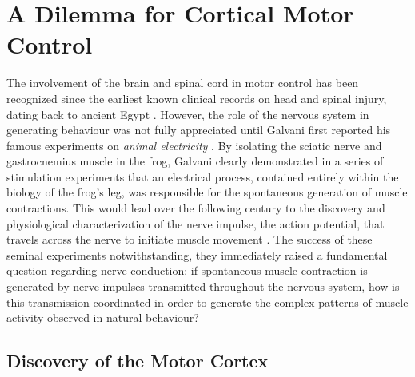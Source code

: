 \section{A Dilemma for Cortical Motor Control}

The involvement of the brain and spinal cord in motor control has been recognized since the earliest known clinical records on head and spinal injury, dating back to ancient Egypt \cite{Louis1994,VanMiddendorp2010}. However, the role of the nervous system in generating behaviour was not fully appreciated until Galvani first reported his famous experiments on \textit{animal electricity} \cite{Galvani1791}. By isolating the sciatic nerve and gastrocnemius muscle in the frog, Galvani clearly demonstrated in a series of stimulation experiments that an electrical process, contained entirely within the biology of the frog's leg, was responsible for the spontaneous generation of muscle contractions. This would lead over the following century to the discovery and physiological characterization of the nerve impulse, the action potential, that travels across the nerve to initiate muscle movement \cite{DuBois-Reymond1843,Bernstein1868,Schuetze1983}. The success of these seminal experiments notwithstanding, they immediately raised a fundamental question regarding nerve conduction: if spontaneous muscle contraction is generated by nerve impulses transmitted throughout the nervous system, how is this transmission coordinated in order to generate the complex patterns of muscle activity observed in natural behaviour?

\subsection{Discovery of the Motor Cortex}

